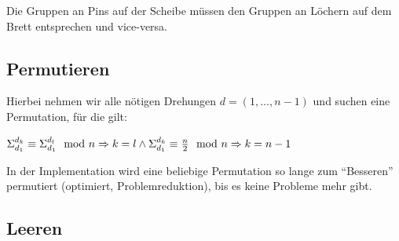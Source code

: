 \documentclass{article}
\begin{document}
Die Gruppen an Pins auf der Scheibe müssen den Gruppen an Löchern auf dem Brett entsprechen und vice-versa.

\subsection{Permutieren}

Hierbei nehmen wir alle nötigen Drehungen $d = (1, ..., n-1)$ und suchen eine Permutation, für die gilt:

$
\Sigma_{d_1}^{d_{k}} \equiv \Sigma_{d_1}^{d_{l}} \mod n \Rightarrow k = l \\
\land \Sigma_{d_1}^{d_{k}} \equiv \frac{n}{2} \mod n \Rightarrow k = n-1
$

In der Implementation wird eine beliebige Permutation so lange zum ``Besseren'' permutiert (optimiert, Problemreduktion), bis es keine Probleme mehr gibt.

\subsection{Leeren}
\end{document}
